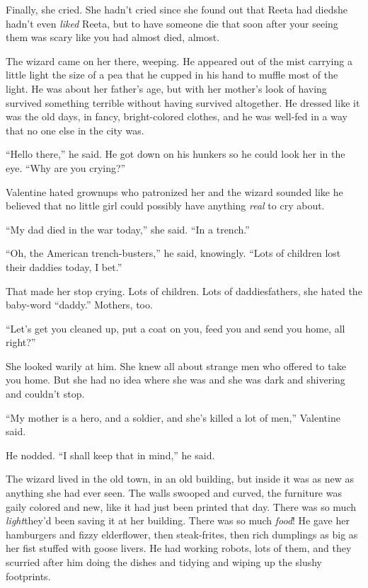 Finally, she cried. She hadn’t cried since she found out that Reeta
had died\dash{}she hadn’t even \emph{liked} Reeta, but to have someone
die that soon after your seeing them was scary like you had almost
died, almost.

The wizard came on her there, weeping. He appeared out of the mist
carrying a little light the size of a pea that he cupped in his
hand to muffle most of the light. He was about her father’s age,
but with her mother’s look of having survived something terrible
without having survived altogether. He dressed like it was the old
days, in fancy, bright-colored clothes, and he was well-fed in a
way that no one else in the city was.

“Hello there,” he said. He got down on his hunkers so he could look
her in the eye. “Why are you crying?”

Valentine hated grownups who patronized her and the wizard sounded
like he believed that no little girl could possibly have anything
\emph{real} to cry about.

“My dad died in the war today,” she said. “In a trench.”

“Oh, the American trench-busters,” he said, knowingly. “Lots of
children lost their daddies today, I bet.”

That made her stop crying. Lots of children. Lots of
daddies\dash{}fathers, she hated the baby-word “daddy.” Mothers, too.

“Let’s get you cleaned up, put a coat on you, feed you and send you
home, all right?”

She looked warily at him. She knew all about strange men who
offered to take you home. But she had no idea where she was and she
was dark and shivering and couldn’t stop.

“My mother is a hero, and a soldier, and she’s killed a lot of
men,” Valentine said.

He nodded. “I shall keep that in mind,” he said.

The wizard lived in the old town, in an old building, but inside it
was as new as anything she had ever seen. The walls swooped and
curved, the furniture was gaily colored and new, like it had just
been printed that day. There was so much \emph{light}\dash{}they’d been
saving it at her building. There was so much \emph{food}! He gave
her hamburgers and fizzy elderflower, then steak-frites, then rich
dumplings as big as her fist stuffed with goose livers. He had
working robots, lots of them, and they scurried after him doing the
dishes and tidying and wiping up the slushy footprints.

